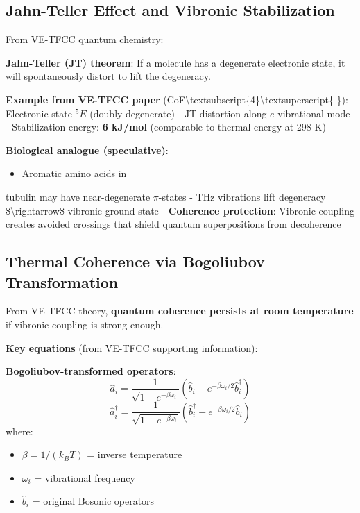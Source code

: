 \subsection{Jahn-Teller Effect and Vibronic Stabilization}\label{jahn-teller-effect-and-vibronic-stabilization}

From VE-TFCC quantum chemistry:

\textbf{Jahn-Teller (JT) theorem}: If a molecule has a degenerate
electronic state, it will spontaneously distort to lift the degeneracy.

\textbf{Example from VE-TFCC paper}
(CoF\textbackslash textsubscript\{4\}\textbackslash textsuperscript\{-\}):
- Electronic state \(^5E\) (doubly degenerate) - JT distortion along
\(e\) vibrational mode - Stabilization energy: \textbf{6 kJ/mol}
(comparable to thermal energy at 298 K)

\textbf{Biological analogue (speculative)}:
\begin{itemize}
\item Aromatic amino acids in
\end{itemize}

tubulin may have near-degenerate \(\pi\)-states - THz vibrations lift
degeneracy \$\textbackslash rightarrow\$ vibronic ground state -
\textbf{Coherence protection}: Vibronic coupling creates avoided
crossings that shield quantum superpositions from decoherence

\subsection{Thermal Coherence via Bogoliubov Transformation}\label{thermal-coherence-via-bogoliubov-transformation}

From VE-TFCC theory, \textbf{quantum coherence persists at room
temperature} if vibronic coupling is strong enough.

\textbf{Key equations} (from VE-TFCC supporting information):

\textbf{Bogoliubov-transformed operators}:
\begin{equation}
\label{eq:bogoliubov-a}
\hat{a}_i = \frac{1}{\sqrt{1 - e^{-\beta \omega_i}}} \left( \hat{b}_i - e^{-\beta \omega_i/2} \hat{b}_i^\dagger \right)
\end{equation}
\begin{equation}
\label{eq:bogoliubov-a-dag}
\hat{a}_i^\dagger = \frac{1}{\sqrt{1 - e^{-\beta \omega_i}}} \left( \hat{b}_i^\dagger - e^{-\beta \omega_i/2} \hat{b}_i \right)
\end{equation}
where:
\begin{itemize}
\item $\beta = 1/(k_B T)$ = inverse temperature
\item $\omega_i$ = vibrational frequency
\item $\hat{b}_i$ = original Bosonic operators
\end{itemize}

